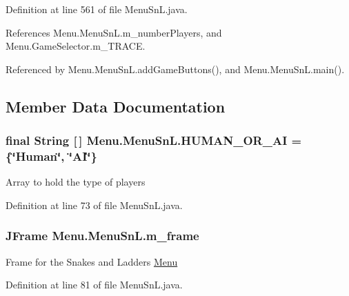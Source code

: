 Definition at line 561 of file Menu\+Sn\+L.\+java.



References Menu.\+Menu\+Sn\+L.\+m\+\_\+number\+Players, and Menu.\+Game\+Selector.\+m\+\_\+\+T\+R\+A\+C\+E.



Referenced by Menu.\+Menu\+Sn\+L.\+add\+Game\+Buttons(), and Menu.\+Menu\+Sn\+L.\+main().



\subsection{Member Data Documentation}
\hypertarget{class_menu_1_1_menu_sn_l_a7cd650c1f3cf334aafb3be5b3ad1b158}{}
\subsubsection[{H\+U\+M\+A\+N\+\_\+\+O\+R\+\_\+\+A\+I}]{\setlength{\rightskip}{0pt plus 5cm}final String \mbox{[}$\,$\mbox{]} Menu.\+Menu\+Sn\+L.\+H\+U\+M\+A\+N\+\_\+\+O\+R\+\_\+\+A\+I = \{\char`\"{}Human\char`\"{}, \char`\"{}A\+I\char`\"{}\}\hspace{0.3cm}{\ttfamily [private]}}\label{class_menu_1_1_menu_sn_l_a7cd650c1f3cf334aafb3be5b3ad1b158}
Array to hold the type of players 

Definition at line 73 of file Menu\+Sn\+L.\+java.

\hypertarget{class_menu_1_1_menu_sn_l_af43a9353bb0cfe3d29fa37d67b794a65}{}
\subsubsection[{m\+\_\+frame}]{\setlength{\rightskip}{0pt plus 5cm}J\+Frame Menu.\+Menu\+Sn\+L.\+m\+\_\+frame\hspace{0.3cm}{\ttfamily [private]}}\label{class_menu_1_1_menu_sn_l_af43a9353bb0cfe3d29fa37d67b794a65}
Frame for the Snakes and Ladders \hyperlink{namespace_menu}{Menu} 

Definition at line 81 of file Menu\+Sn\+L.\+java.

\hypertarget{class_menu_1_1_menu_sn_l_ac45af15bf2aabd1916063700e1e44f08}{}
